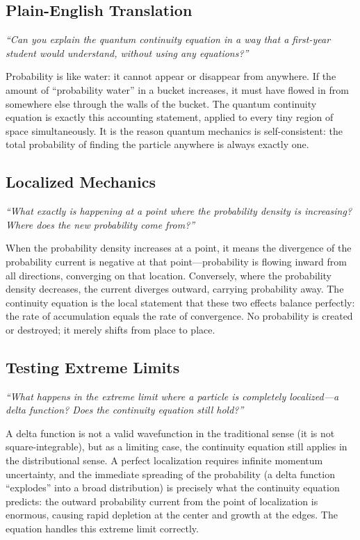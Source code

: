 \subsection*{Plain-English Translation}
\textit{``Can you explain the quantum continuity equation in a way that a first-year student would understand, without using any equations?''}

Probability is like water: it cannot appear or disappear from anywhere. If the amount of ``probability water'' in a bucket increases, it must have flowed in from somewhere else through the walls of the bucket. The quantum continuity equation is exactly this accounting statement, applied to every tiny region of space simultaneously. It is the reason quantum mechanics is self-consistent: the total probability of finding the particle anywhere is always exactly one.

\subsection*{Localized Mechanics}
\textit{``What exactly is happening at a point where the probability density is increasing? Where does the new probability come from?''}

When the probability density increases at a point, it means the divergence of the probability current is negative at that point---probability is flowing inward from all directions, converging on that location. Conversely, where the probability density decreases, the current diverges outward, carrying probability away. The continuity equation is the local statement that these two effects balance perfectly: the rate of accumulation equals the rate of convergence. No probability is created or destroyed; it merely shifts from place to place.

\subsection*{Testing Extreme Limits}
\textit{``What happens in the extreme limit where a particle is completely localized---a delta function? Does the continuity equation still hold?''}

A delta function is not a valid wavefunction in the traditional sense (it is not square-integrable), but as a limiting case, the continuity equation still applies in the distributional sense. A perfect localization requires infinite momentum uncertainty, and the immediate spreading of the probability (a delta function ``explodes'' into a broad distribution) is precisely what the continuity equation predicts: the outward probability current from the point of localization is enormous, causing rapid depletion at the center and growth at the edges. The equation handles this extreme limit correctly.

